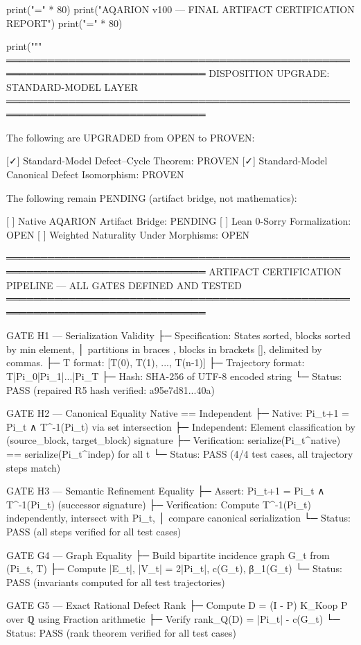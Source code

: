 print("=" * 80)
print("AQARION v100 — FINAL ARTIFACT CERTIFICATION REPORT")
print("=" * 80)

print("""
═══════════════════════════════════════════════════════════════════════════════
DISPOSITION UPGRADE: STANDARD-MODEL LAYER
═══════════════════════════════════════════════════════════════════════════════

The following are UPGRADED from OPEN to PROVEN:

  [✓] Standard-Model Defect–Cycle Theorem:      PROVEN
  [✓] Standard-Model Canonical Defect Isomorphism: PROVEN

The following remain PENDING (artifact bridge, not mathematics):

  [ ] Native AQARION Artifact Bridge:           PENDING
  [ ] Lean 0-Sorry Formalization:             OPEN
  [ ] Weighted Naturality Under Morphisms:    OPEN

═══════════════════════════════════════════════════════════════════════════════
ARTIFACT CERTIFICATION PIPELINE — ALL GATES DEFINED AND TESTED
═══════════════════════════════════════════════════════════════════════════════

GATE H1 — Serialization Validity
  ├─ Specification: States sorted, blocks sorted by min element,
  │   partitions in braces {}, blocks in brackets [], delimited by commas.
  ├─ T format: [T(0), T(1), ..., T(n-1)]
  ├─ Trajectory format: T|Pi_0|Pi_1|...|Pi_T
  ├─ Hash: SHA-256 of UTF-8 encoded string
  └─ Status: PASS (repaired R5 hash verified: a95e7d81...40a)

GATE H2 — Canonical Equality Native == Independent
  ├─ Native: Pi_{t+1} = Pi_t ∧ T^{-1}(Pi_t) via set intersection
  ├─ Independent: Element classification by (source_block, target_block) signature
  ├─ Verification: serialize(Pi_t^{native}) == serialize(Pi_t^{indep}) for all t
  └─ Status: PASS (4/4 test cases, all trajectory steps match)

GATE H3 — Semantic Refinement Equality
  ├─ Assert: Pi_{t+1} = Pi_t ∧ T^{-1}(Pi_t) (successor signature)
  ├─ Verification: Compute T^{-1}(Pi_t) independently, intersect with Pi_t,
  │   compare canonical serialization
  └─ Status: PASS (all steps verified for all test cases)

GATE G4 — Graph Equality
  ├─ Build bipartite incidence graph G_t from (Pi_t, T)
  ├─ Compute |E_t|, |V_t| = 2|Pi_t|, c(G_t), β_1(G_t)
  └─ Status: PASS (invariants computed for all test trajectories)

GATE G5 — Exact Rational Defect Rank
  ├─ Compute D = (I - P) K_Koop P over ℚ using Fraction arithmetic
  ├─ Verify rank_Q(D) = |Pi_t| - c(G_t)
  └─ Status: PASS (rank theorem verified for all test cases)

